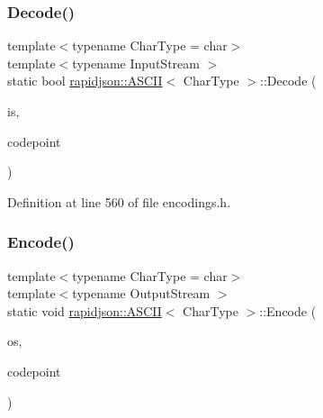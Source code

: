 \subsubsection{\texorpdfstring{Decode()}{Decode()}}
{\footnotesize\ttfamily template$<$typename Char\+Type  = char$>$ \\
template$<$typename Input\+Stream $>$ \\
static bool \mbox{\hyperlink{structrapidjson_1_1_a_s_c_i_i}{rapidjson\+::\+A\+S\+C\+II}}$<$ Char\+Type $>$\+::Decode (\begin{DoxyParamCaption}\item[{Input\+Stream \&}]{is,  }\item[{unsigned $\ast$}]{codepoint }\end{DoxyParamCaption})\hspace{0.3cm}{\ttfamily [static]}}



Definition at line 560 of file encodings.\+h.


\begin{DoxyCode}{0}

\end{DoxyCode}
\mbox{\label{structrapidjson_1_1_a_s_c_i_i_adac1c32ed7098e5814dc4b2d1b6f04b5}} 
\subsubsection{\texorpdfstring{Encode()}{Encode()}}
{\footnotesize\ttfamily template$<$typename Char\+Type  = char$>$ \\
template$<$typename Output\+Stream $>$ \\
static void \mbox{\hyperlink{structrapidjson_1_1_a_s_c_i_i}{rapidjson\+::\+A\+S\+C\+II}}$<$ Char\+Type $>$\+::Encode (\begin{DoxyParamCaption}\item[{Output\+Stream \&}]{os,  }\item[{unsigned}]{codepoint }\end{DoxyParamCaption})\hspace{0.3cm}{\ttfamily [static]}}



